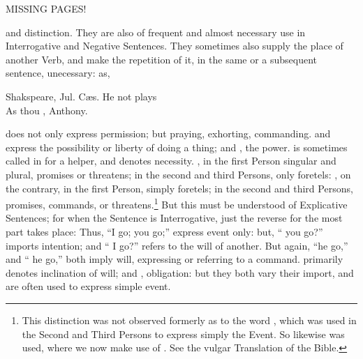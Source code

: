 

MISSING PAGES!

and distinction. They are also of frequent and almost necessary use in
Interrogative and Negative Sentences. They sometimes also supply the
place of another Verb, and make the repetition of it, in the same or a
subsequent sentence, unecessary: as,

\begin{aquote}{Shakspeare, Jul. C\ae{}s.}
  He  not plays\\
  As thou , Anthony.
\end{aquote}

 does not only express permission; but praying, exhorting,
commanding.  and  express the possibility or liberty
of doing a thing;  and , the power.  is
sometimes called in for a helper, and denotes necessity. , in
the first Person singular and plural, promises or threatens; in the
second and third Persons, only foretels: , on the contrary, in
the first Person, simply foretels; in the second and third Persons,
promises, commands, or threatens.\footnote{This distinction was not
  observed formerly as to the word , which was used in the
  Second and Third Persons to express simply the Event. So likewise
   was used, where we now make use of . See the
  vulgar Translation of the Bible.} But this must be understood of
Explicative Sentences; for when the Sentence is Interrogative, just the
reverse for the most part takes place: Thus, ``I  go; you
 go;'' express event only: but, `` you go?'' imports
intention; and `` I go?'' refers to the will of another. But
again, ``he  go,'' and `` he go,'' both imply will,
expressing or referring to a command.  primarily denotes
inclination of will; and , obligation: but they both vary
their import, and are often used to express simple event.


